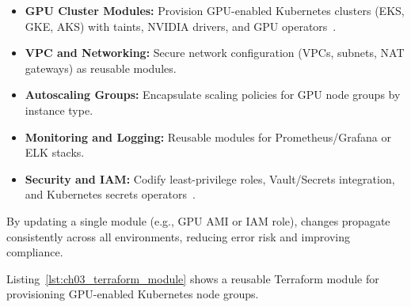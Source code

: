 \begin{itemize}
  \item \textbf{GPU Cluster Modules:} Provision GPU-enabled Kubernetes clusters (EKS, GKE, AKS) with taints, NVIDIA drivers, and GPU operators~\cite{nvidia-k8s-device-plugin}.
  \item \textbf{VPC and Networking:} Secure network configuration (VPCs, subnets, NAT gateways) as reusable modules.
  \item \textbf{Autoscaling Groups:} Encapsulate scaling policies for GPU node groups by instance type.
  \item \textbf{Monitoring and Logging:} Reusable modules for Prometheus/Grafana or ELK stacks.
  \item \textbf{Security and IAM:} Codify least-privilege roles, Vault/Secrets integration, and Kubernetes secrets operators~\cite{opa-docs,sentinel-docs}.
\end{itemize}

By updating a single module (e.g., GPU AMI or IAM role), changes propagate consistently across all environments, reducing error risk and improving compliance.

Listing~\ref{lst:ch03_terraform_module} shows a reusable Terraform module for provisioning GPU-enabled Kubernetes node groups.


